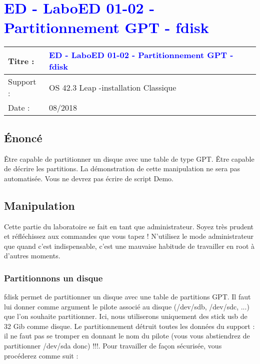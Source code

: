 \lstset{language=c}
\renewcommand{\titre}{\textcolor{blue}{ ED - LaboED 01-02 - Partitionnement GPT - fdisk}}

\lhead{ \titre }
\section{{\titre} }

\begin{tabular}{|l|l|}
\hline
Titre : 	& \titre \\\hline
Support : 	& OS 42.3 Leap -installation Classique \\\hline
Date :		& 08/2018\\\hline
\end{tabular}

\subsection{Énoncé}

Être capable de partitionner un disque avec une table de type GPT. 
Être capable de décrire les partitions. La démonstration de cette manipulation ne sera pas automatisée. Vous ne devrez pas écrire de script Demo. \\

\subsection{Manipulation}

Cette partie du laboratoire se fait en tant que administrateur. Soyez très prudent et réfléchissez aux commandes que vous tapez !
N'utilisez le mode administrateur que quand c'est indispensable, c'est une mauvaise habitude de travailler en root à d'autres moments.\\

\subsubsection{Partitionnons un disque}

fdisk permet de partitionner un disque avec une table de partitions GPT. Il faut lui donner comme argument le pilote associé au disque (/dev/sdb, /dev/sdc, ...) que l'on souhaite partitionner. Ici, nous utiliserons uniquement des stick usb de 32 Gib comme disque. Le partitionnement détruit toutes les données du support : il ne faut pas se tromper en donnant le nom du pilote (vous vous abstiendrez de partitionner /dev/sda donc) !!!. Pour travailler de façon sécurisée, vous procéderez comme suit :

